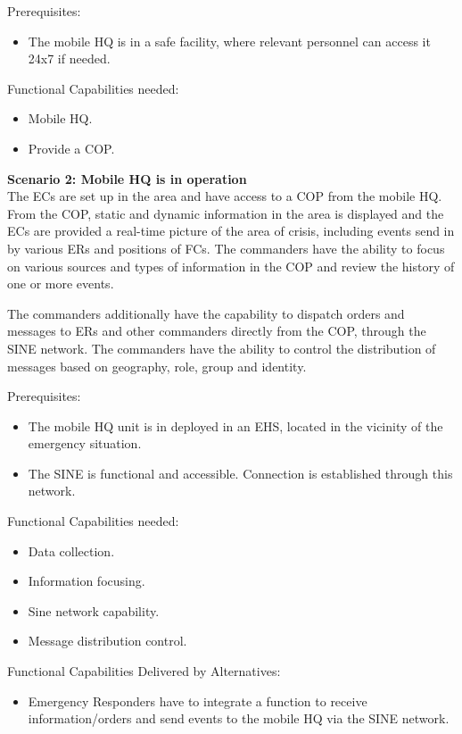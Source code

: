 \noindent Prerequisites:
\begin{itemize}
	\item The mobile HQ is in a safe facility, where relevant personnel can access it 24x7 if needed.
\end{itemize}

\noindent Functional Capabilities needed:
\begin{itemize}
	\itemsep0em
	\item Mobile HQ.
	\item Provide a COP.
\end{itemize}

\vspace{20pt}
\noindent \textbf{Scenario 2: Mobile HQ is in operation} \\
The ECs are set up in the area and have access to a COP from the mobile HQ.
From the COP, static and dynamic information in the area is displayed and the ECs are provided a real-time picture of the area of crisis, including events send in by various ERs and positions of FCs.
The commanders have the ability to focus on various sources and types of information in the COP and review the history of one or more events. 

The commanders additionally have the capability to dispatch orders and messages to ERs and other commanders directly from the COP, through the SINE network. The commanders have the ability to control the distribution of messages based on geography, role, group and identity.

\noindent Prerequisites:
\begin{itemize}
	\itemsep0em
	\item The mobile HQ unit is in deployed in an EHS, located in the vicinity of the emergency situation.
	\item The SINE is functional and accessible. Connection is established through this network.
\end{itemize}

\newpage
\noindent Functional Capabilities needed:
\begin{itemize}
	\itemsep0em
	\item Data collection.
	\item Information focusing.
	\item Sine network capability.
	\item Message distribution control.
\end{itemize}

\noindent Functional Capabilities Delivered by Alternatives:
\begin{itemize}
	\item Emergency Responders have to integrate a function to receive information/orders and send events to the mobile HQ via the SINE network.
\end{itemize} 

